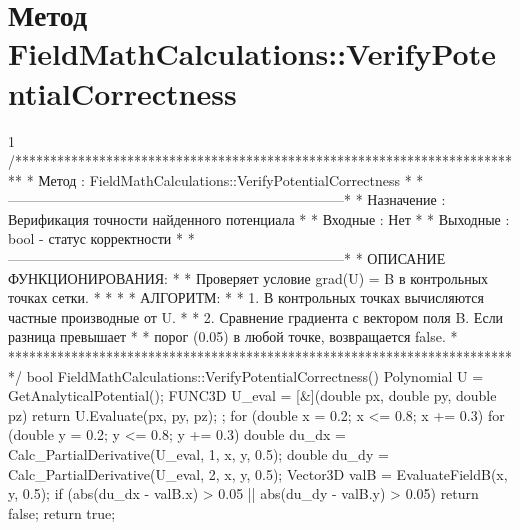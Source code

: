 \section{Метод FieldMathCalculations::VerifyPotentialCorrectness}
\footnotesize
\begin{listing}{1}
/*************************************************************************
* Метод         : FieldMathCalculations::VerifyPotentialCorrectness      *
*------------------------------------------------------------------------*
* Назначение    : Верификация точности найденного потенциала             *
* Входные       : Нет                                                    *
* Выходные      : bool - статус корректности                             *
*------------------------------------------------------------------------*
* ОПИСАНИЕ ФУНКЦИОНИРОВАНИЯ:                                             *
* Проверяет условие grad(U) = B в контрольных точках сетки.              *
* *
* АЛГОРИТМ:                                                              *
* 1. В контрольных точках вычисляются частные производные от U.          *
* 2. Сравнение градиента с вектором поля B. Если разница превышает       *
* порог (0.05) в любой точке, возвращается false.                       *
*************************************************************************/
bool FieldMathCalculations::VerifyPotentialCorrectness() {
    Polynomial U = GetAnalyticalPotential();
    FUNC3D U_eval = [&](double px, double py, double pz) { 
        return U.Evaluate(px, py, pz); 
    };
    for (double x = 0.2; x <= 0.8; x += 0.3) {
        for (double y = 0.2; y <= 0.8; y += 0.3) {
            double du_dx = Calc_PartialDerivative(U_eval, 1, x, y, 0.5);
            double du_dy = Calc_PartialDerivative(U_eval, 2, x, y, 0.5);
            Vector3D valB = EvaluateFieldB(x, y, 0.5);
            if (abs(du_dx - valB.x) > 0.05 || abs(du_dy - valB.y) > 0.05) 
                return false;
        }
    }
    return true;
}
\end{listing}
\normalsize

\pagebreak

